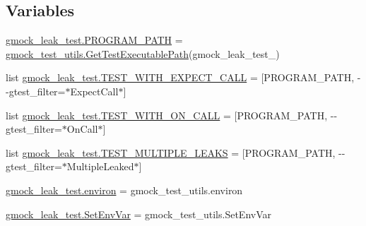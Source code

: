 \subsection*{Variables}
\begin{DoxyCompactItemize}
\item 
\mbox{\hyperlink{namespacegmock__leak__test_ace925116117368cd02a7b45571f5133d}{gmock\+\_\+leak\+\_\+test.\+P\+R\+O\+G\+R\+A\+M\+\_\+\+P\+A\+TH}} = \mbox{\hyperlink{namespacegmock__test__utils_aadd2927024e24f0c53f7ba283402cdb1}{gmock\+\_\+test\+\_\+utils.\+Get\+Test\+Executable\+Path}}(\textquotesingle{}gmock\+\_\+leak\+\_\+test\+\_\+\textquotesingle{})
\item 
list \mbox{\hyperlink{namespacegmock__leak__test_aa03214d2fad1ee0fd3f3101da688ebfc}{gmock\+\_\+leak\+\_\+test.\+T\+E\+S\+T\+\_\+\+W\+I\+T\+H\+\_\+\+E\+X\+P\+E\+C\+T\+\_\+\+C\+A\+LL}} = \mbox{[}P\+R\+O\+G\+R\+A\+M\+\_\+\+P\+A\+TH, \textquotesingle{}-\/-\/gtest\+\_\+filter=$\ast$Expect\+Call$\ast$\textquotesingle{}\mbox{]}
\item 
list \mbox{\hyperlink{namespacegmock__leak__test_a5b7e5890b4022a37ef82bdf4eb22ef44}{gmock\+\_\+leak\+\_\+test.\+T\+E\+S\+T\+\_\+\+W\+I\+T\+H\+\_\+\+O\+N\+\_\+\+C\+A\+LL}} = \mbox{[}P\+R\+O\+G\+R\+A\+M\+\_\+\+P\+A\+TH, \textquotesingle{}-\/-\/gtest\+\_\+filter=$\ast$On\+Call$\ast$\textquotesingle{}\mbox{]}
\item 
list \mbox{\hyperlink{namespacegmock__leak__test_a9a529935171ee6ab369902d9a77ffbf5}{gmock\+\_\+leak\+\_\+test.\+T\+E\+S\+T\+\_\+\+M\+U\+L\+T\+I\+P\+L\+E\+\_\+\+L\+E\+A\+KS}} = \mbox{[}P\+R\+O\+G\+R\+A\+M\+\_\+\+P\+A\+TH, \textquotesingle{}-\/-\/gtest\+\_\+filter=$\ast$Multiple\+Leaked$\ast$\textquotesingle{}\mbox{]}
\item 
\mbox{\hyperlink{namespacegmock__leak__test_a9437a2d2e3bde77354e5c6443ef129f8}{gmock\+\_\+leak\+\_\+test.\+environ}} = gmock\+\_\+test\+\_\+utils.\+environ
\item 
\mbox{\hyperlink{namespacegmock__leak__test_a1ab1da2afb1748500a059d59660330cb}{gmock\+\_\+leak\+\_\+test.\+Set\+Env\+Var}} = gmock\+\_\+test\+\_\+utils.\+Set\+Env\+Var
\end{DoxyCompactItemize}
